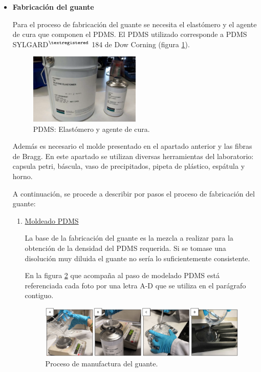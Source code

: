 \begin{itemize}
 
	\item \textbf{Fabricación del guante}

	Para el proceso de fabricación del guante se necesita el elastómero y el agente de cura que componen el PDMS. El PDMS utilizado corresponde a PDMS SYLGARD$^{\textregistered}$ 184 de Dow Corning (figura \ref{fig:pdms}).
			
	\begin{figure}[H]
		\centering
		\includegraphics[width=0.5\textwidth]{./img/PDMS}
		\caption{PDMS: Elastómero y agente de cura.} \label{fig:pdms}
	\end{figure}	

	Además es necesario el molde presentado en el apartado anterior y las fibras de Bragg. En este apartado se utilizan diversas herramientas del laboratorio: capsula petri, báscula, vaso de precipitados, pipeta de plástico, espátula y  horno. 
	

	A continuación, se procede a describir por pasos el proceso de fabricación del guante:
	\begin{enumerate}
		\item \underline{Moldeado PDMS}
		
		La base de la fabricación del guante es la mezcla a realizar para la obtención de la densidad del PDMS requerida. Si se tomase una disolución muy diluida el guante no sería lo suficientemente consistente. 
		
		
		En la figura \ref{fig:fabricacionGuante} que acompaña al paso de modelado PDMS está referenciada cada foto por una letra A-D que se utiliza en el parágrafo contiguo.
		
		\begin{figure}[H]
			\centering
			\includegraphics[width=1\textwidth]{./img/fabricacionGuante}
			\caption{Proceso de manufactura del guante.} \label{fig:fabricacionGuante}
		\end{figure}
		

\end{enumerate}
\end{itemize}
